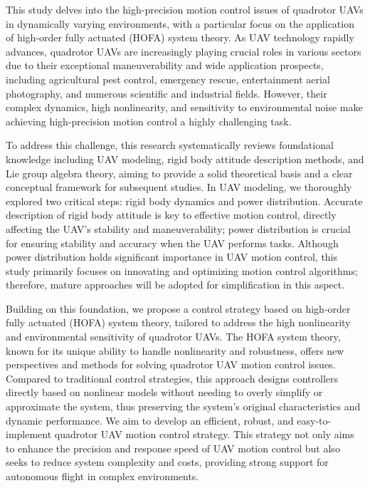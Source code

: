 
\begin{digest}
  This study delves into the high-precision motion control issues of quadrotor UAVs in dynamically varying environments, with a particular focus on the application of high-order fully actuated (HOFA) system theory. As UAV technology rapidly advances, quadrotor UAVs are increasingly playing crucial roles in various sectors due to their exceptional maneuverability and wide application prospects, including agricultural pest control, emergency rescue, entertainment aerial photography, and numerous scientific and industrial fields. However, their complex dynamics, high nonlinearity, and sensitivity to environmental noise make achieving high-precision motion control a highly challenging task.

  To address this challenge, this research systematically reviews foundational knowledge including UAV modeling, rigid body attitude description methods, and Lie group algebra theory, aiming to provide a solid theoretical basis and a clear conceptual framework for subsequent studies. In UAV modeling, we thoroughly explored two critical steps: rigid body dynamics and power distribution. Accurate description of rigid body attitude is key to effective motion control, directly affecting the UAV's stability and maneuverability; power distribution is crucial for ensuring stability and accuracy when the UAV performs tasks. Although power distribution holds significant importance in UAV motion control, this study primarily focuses on innovating and optimizing motion control algorithms; therefore, mature approaches will be adopted for simplification in this aspect.
  
  Building on this foundation, we propose a control strategy based on high-order fully actuated (HOFA) system theory, tailored to address the high nonlinearity and environmental sensitivity of quadrotor UAVs. The HOFA system theory, known for its unique ability to handle nonlinearity and robustness, offers new perspectives and methods for solving quadrotor UAV motion control issues. Compared to traditional control strategies, this approach designs controllers directly based on nonlinear models without needing to overly simplify or approximate the system, thus preserving the system's original characteristics and dynamic performance. We aim to develop an efficient, robust, and easy-to-implement quadrotor UAV motion control strategy. This strategy not only aims to enhance the precision and response speed of UAV motion control but also seeks to reduce system complexity and costs, providing strong support for autonomous flight in complex environments.
  

\end{digest}
